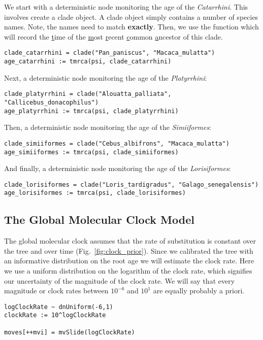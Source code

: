 We start with a deterministic node monitoring the age of the \emph{Catarrhini}.
This involves create a clade object.
A clade object simply contains a number of species names.
Note, the names need to match \textbf{exactly}.
Then, we use the  function which will record the \underline{t}ime of the \underline{m}ost \underline{r}ecent \underline{c}ommon \underline{a}ncestor of this clade.
{\tt \begin{snugshade*}
\begin{lstlisting}
clade_catarrhini = clade("Pan_paniscus", "Macaca_mulatta")
age_catarrhini := tmrca(psi, clade_catarrhini)
\end{lstlisting}
\end{snugshade*}}

Next, a deterministic node monitoring the age of the \emph{Platyrrhini}:
{\tt \begin{snugshade*}
\begin{lstlisting}
clade_platyrrhini = clade("Alouatta_palliata", "Callicebus_donacophilus")
age_platyrrhini := tmrca(psi, clade_platyrrhini)
\end{lstlisting}
\end{snugshade*}}

Then, a deterministic node monitoring the age of the \emph{Simiiformes}:
{\tt \begin{snugshade*}
\begin{lstlisting}
clade_simiiformes = clade("Cebus_albifrons", "Macaca_mulatta")
age_simiiformes := tmrca(psi, clade_simiiformes)
\end{lstlisting}
\end{snugshade*}}

And finally, a deterministic node monitoring the age of the \emph{Lorisiformes}:
{\tt \begin{snugshade*}
\begin{lstlisting}
clade_lorisiformes = clade("Loris_tardigradus", "Galago_senegalensis")
age_lorisiformes := tmrca(psi, clade_lorisiformes)
\end{lstlisting}
\end{snugshade*}}


\subsection{The Global Molecular Clock Model}

The global molecular clock assumes that the rate of substitution is constant over the tree and over time (Fig.~\ref{fig:clock_prior}).
Since we calibrated the tree with an informative distribution on the root age we will estimate the clock rate.
Here we use a uniform distribution on the logarithm of the clock rate, which signifies our uncertainty of the magnitude of the clock rate.
We will say that every magnitude or clock rates between $10^{-6}$ and $10^{1}$ are equally probably a priori.
{\tt \begin{snugshade*}
\begin{lstlisting}
logClockRate ~ dnUniform(-6,1)
clockRate := 10^logClockRate

moves[++mvi] = mvSlide(logClockRate)
\end{lstlisting}
\end{snugshade*}}

